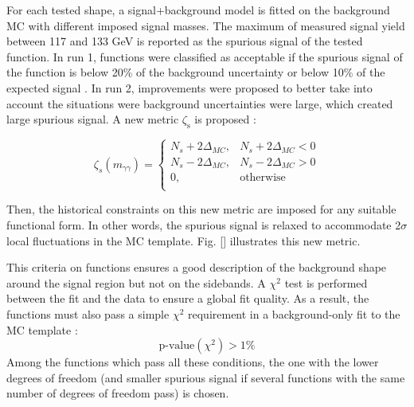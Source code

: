 \begin{enumerate}
\begin{enumerate}
For each tested shape, a signal+background model is fitted on the background MC with different imposed signal masses.
The maximum of measured signal yield between 117 and 133 GeV is reported as the spurious signal of the tested function.
In run 1, functions were classified as acceptable if the spurious signal of the function is below 20\% of the background uncertainty or below 10\% of the expected signal \cite{ATLAS-CONF-2012-091}.
In run 2, improvements were proposed \cite{ATL-COM-PHYS-2016-1784} to better take into account the situations were background uncertainties were large, which created large spurious signal.
A new metric \(\zeta_{\text{s}}\) is proposed :

\begin{equation}
\zeta_{s}(m_{\gamma\gamma}) =
\left\{
\begin{array}{ll}
N_s + 2\Delta_{MC},   &   N_s + 2\Delta_{MC} < 0 \\
N_s - 2\Delta_{MC},   &   N_s - 2\Delta_{MC} > 0 \\
0                   ,&\text{otherwise}          \\
\end{array}
\right.
\label{eq:relaxed_spurious_signal}
\end{equation}

Then, the historical constraints on this new metric are imposed for any suitable functional form.
In other words, the spurious signal is relaxed to accommodate 2$\sigma$ local fluctuations in the MC template.
Fig. \ref{} illustrates this new metric.



This criteria on functions ensures a good description of the background shape around the signal region but not on the sidebands.
A \(\chi^{\text{2}}\) test is performed between the fit and the data to ensure a global fit quality.
As a result, the functions must also pass a simple $\chi^2$ requirement in a background-only fit to the MC template :
\begin{equation}
\text{p-value}(\chi^2)>1\%
\end{equation}
Among the functions which pass all these conditions, the one with the lower degrees of freedom (and smaller spurious signal if several functions with the same number of degrees of freedom pass) is chosen.



\end{enumerate}
\end{enumerate}
